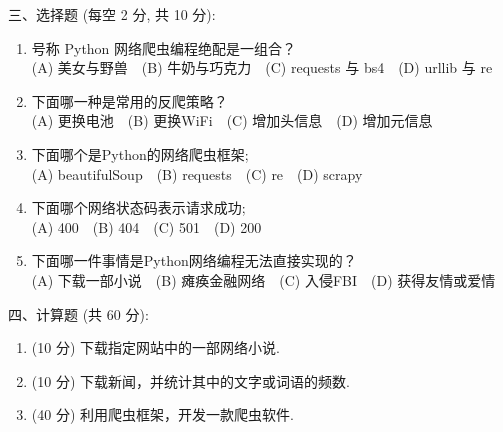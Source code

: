 \documentclass[12pt,a4paper]{ctexart}%
\begin{document}
%
\noindent 三、选择题 (每空 2 分, 共 10 分):%
\begin{enumerate}[1)]%
\item%
号称 Python 网络爬虫编程绝配是一组合？~~\mypar{}\\
(A) 美女与野兽~~(B) 牛奶与巧克力~~(C) requests 与 bs4~~(D) urllib 与 re%
\item%
下面哪一种是常用的反爬策略？~~\mypar{}\\
(A) 更换电池~~(B) 更换WiFi~~(C) 增加头信息~~(D) 增加元信息%
\item%
下面哪个是Python的网络爬虫框架;~~\mypar{}\\
(A) beautifulSoup~~(B) requests~~(C) re~~(D) scrapy%
\item%
下面哪个网络状态码表示请求成功;~~\mypar{}\\
(A) 400~~(B) 404~~(C) 501~~(D) 200%
\item%
下面哪一件事情是Python网络编程无法直接实现的？~~\mypar{}\\
(A) 下载一部小说~~(B) 瘫痪金融网络~~(C) 入侵FBI~~(D) 获得友情或爱情%
\end{enumerate}%


%
\noindent 四、计算题 (共 60 分):%
\begin{enumerate}[1)]%
\item%
(10 分)
下载指定网站中的一部网络小说.
\item%
(10 分)
下载新闻，并统计其中的文字或词语的频数.
\item%
(40 分)
利用爬虫框架，开发一款爬虫软件.
\end{enumerate}%

%
\end{document}
